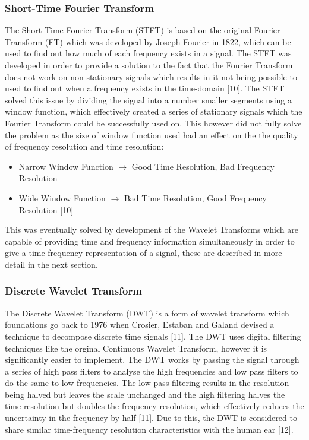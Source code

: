 \documentclass[a4paper, 11pt]{article}
\begin{document}
\subsubsection{Short-Time Fourier Transform}
The Short-Time Fourier Transform (STFT) is based on the original Fourier Transform (FT) which was developed by Joseph Fourier in 1822, which can be used to find out how much of each frequency exists in a signal. The STFT was developed in order to provide a solution to the fact that the Fourier Transform does not work on non-stationary signals which results in it not being possible to used to find out when a frequency exists in the time-domain [10]. The STFT solved this issue by dividing the signal into a number smaller segments using a window function, which effectively created a series of stationary signals which the Fourier Transform could be successfully used on. This however did not fully solve the problem as the size of window function used had an effect on the the quality of frequency resolution and time resolution:
\begin{itemize}
\item Narrow Window Function $\longrightarrow$  Good Time Resolution, Bad Frequency Resolution
\item Wide Window Function $\longrightarrow$  Bad Time Resolution, Good Frequency Resolution [10]
\end{itemize}

This was eventually solved by development of the Wavelet Transforms which are capable of providing time and frequency information simultaneously in order to give a time-frequency representation of a signal, these are described in more detail in the next section.

\subsubsection{Discrete Wavelet Transform}
The Discrete Wavelet Transform (DWT) is a form of wavelet transform which foundations go back to 1976 when Crosier, Estaban and Galand devised a technique to decompose discrete time signals [11]. The DWT uses digital filtering techniques like the orginal Continuous Wavelet Transform, however it is significantly easier to implement. The DWT works by passing the signal through a series of high pass filters to analyse the high frequencies and low pass filters to do the same to low frequencies. The low pass filtering results in the resolution being halved but leaves the scale unchanged and the high filtering halves the time-resolution but doubles the frequency resolution, which effectively reduces the uncertainty in the frequency by half [11]. Due to this, the DWT is considered to share similar time-frequency resolution characteristics with the human ear [12].
\end{document}
